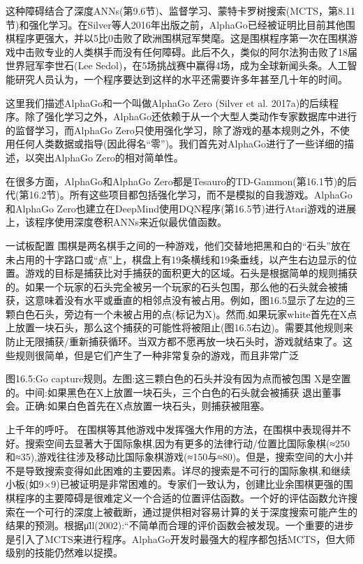 这种障碍结合了深度ANNs(第9.6节)、监督学习、蒙特卡罗树搜索(MCTS，第8.11节)和强化学习。在Silver等人2016年出版之前，AlphaGo已经被证明比目前其他围棋程序更强大，并以5比0击败了欧洲围棋冠军樊麾。这是围棋程序第一次在围棋游戏中击败专业的人类棋手而没有任何障碍。此后不久，类似的阿尔法狗击败了18届世界冠军李世石(Lee Sedol)，在5场挑战赛中赢得4场，成为全球新闻头条。人工智能研究人员认为，一个程序要达到这样的水平还需要许多年甚至几十年的时间。

这里我们描述AlphaGo和一个叫做AlphaGo Zero (Silver et al. 2017a)的后续程序。除了强化学习之外，AlphaGo还依赖于从一个大型人类动作专家数据库中进行的监督学习，而AlphaGo Zero只使用强化学习，除了游戏的基本规则之外，不使用任何人类数据或指导(因此得名“零”)。我们首先对AlphaGo进行了一些详细的描述，以突出AlphaGo Zero的相对简单性。

在很多方面，AlphaGo和AlphaGo Zero都是Tesauro的TD-Gammon(第16.1节)的后代(第16.2节)。所有这些项目都包括强化学习，而不是模拟的自我游戏。AlphaGo和AlphaGo Zero也建立在DeepMind使用DQN程序(第16.5节)进行Atari游戏的进展上，该程序使用深度卷积ANNs来近似最优值函数。


一试板配置
围棋是两名棋手之间的一种游戏，他们交替地把黑和白的“石头”放在未占用的十字路口或“点”上，棋盘上有19条横线和19条垂线，以产生右边显示的位置。游戏的目标是捕获比对手捕获的面积更大的区域。石头是根据简单的规则捕获的。如果一个玩家的石头完全被另一个玩家的石头包围，那么他的石头就会被捕获，这意味着没有水平或垂直的相邻点没有被占用。例如，图16.5显示了左边的三颗白色石头，旁边有一个未被占用的点(标记为X)。然而,如果玩家white首先在X点上放置一块石头，那么这个捕获的可能性将被阻止(图16.5右边)。需要其他规则来防止无限捕获/重新捕获循环。当双方都不愿再放一块石头时，游戏就结束了。这些规则很简单，但是它们产生了一种非常复杂的游戏，而且非常广泛


图16.5:Go capture规则。左图:这三颗白色的石头并没有因为点而被包围
X是空置的。中间:如果黑色在X上放置一块石头，三个白色的石头就会被捕获
退出董事会。正确:如果白色首先在X点放置一块石头，则捕获被阻塞。

上千年的呼吁。
在围棋等其他游戏中发挥强大作用的方法，在围棋中表现得并不好。搜索空间去显著大于国际象棋,因为有更多的法律行动/位置比国际象棋(≈250和≈35),游戏往往涉及移动比国际象棋游戏(≈150与≈80)。但是，搜索空间的大小并不是导致搜索变得如此困难的主要因素。详尽的搜索是不可行的国际象棋,和继续小板(如9×9)已被证明是非常困难的。专家们一致认为，创建比业余围棋更强的围棋程序的主要障碍是很难定义一个合适的位置评估函数。一个好的评估函数允许搜索在一个可行的深度上被截断，通过提供相对容易计算的关于深度搜索可能产生的结果的预测。根据μ̈ll(2002):“不简单而合理的评价函数会被发现。一个重要的进步是引入了MCTS来进行程序。AlphaGo开发时最强大的程序都包括MCTS，但大师级别的技能仍然难以捉摸。

